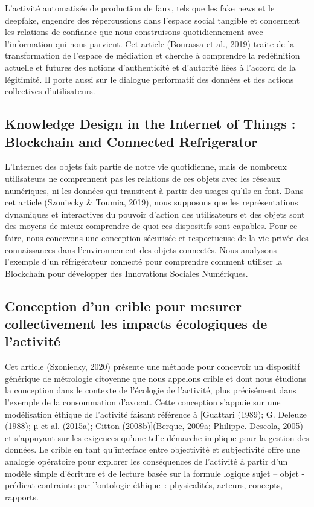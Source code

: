 \documentclass[
  a4paper,
  DIV=11,
  numbers=noendperiod]{scrreprt}
\begin{document}
L'activité automatisée de production de faux, tels que les
\hspace{0pt}fake news\hspace{0pt} et le
\hspace{0pt}deepfake\hspace{0pt}, engendre des répercussions dans
l'espace social tangible et concernent les relations de confiance que
nous construisons quotidiennement avec l'information qui nous parvient.
Cet article (Bourassa et al., 2019) traite de la transformation de
l'espace de médiation et cherche à comprendre la redéfinition actuelle
et futures des notions d'authenticité et d'autorité liées à l'accord de
la légitimité. Il porte aussi sur le dialogue performatif des données et
des actions collectives d'utilisateurs.

\subsection{Knowledge Design in the Internet of Things : Blockchain and
Connected
Refrigerator}\label{knowledge-design-in-the-internet-of-things-blockchain-and-connected-refrigerator}

L'Internet des objets fait partie de notre vie quotidienne, mais de
nombreux utilisateurs ne comprennent pas les relations de ces objets
avec les réseaux numériques, ni les données qui transitent à partir des
usages qu'ils en font. Dans cet article (Szoniecky \& Toumia, 2019),
nous supposons que les représentations dynamiques et interactives du
pouvoir d'action des utilisateurs et des objets sont des moyens de mieux
comprendre de quoi ces dispositifs sont capables. Pour ce faire, nous
concevons une conception sécurisée et respectueuse de la vie privée des
connaissances dans l'environnement des objets connectés. Nous analysons
l'exemple d'un réfrigérateur connecté pour comprendre comment utiliser
la Blockchain pour développer des Innovations Sociales Numériques.

\subsection{Conception d'un crible pour mesurer collectivement les
impacts écologiques de
l'activité}\label{conception-dun-crible-pour-mesurer-collectivement-les-impacts-uxe9cologiques-de-lactivituxe9}

Cet article (Szoniecky, 2020) présente une méthode pour concevoir un
dispositif générique de métrologie citoyenne que nous appelons crible et
dont nous étudions la conception dans le contexte de l'écologie de
l'activité, plus précisément dans l'exemple de la consommation d'avocat.
Cette conception s'appuie sur une modélisation éthique de l'activité
faisant référence à {[}Guattari (1989); G. Deleuze (1988); µ et al.
(2015a); Citton (2008b){]}(Berque, 2009a; Philippe. Descola, 2005) et
s'appuyant sur les exigences qu'une telle démarche implique pour la
gestion des données. Le crible en tant qu'interface entre objectivité et
subjectivité offre une analogie opératoire pour explorer les
conséquences de l'activité à partir d'un modèle simple d'écriture et de
lecture basée sur la formule logique sujet -- objet - prédicat
contrainte par l'ontologie éthique~: physicalités, acteurs, concepts,
rapports.
\end{document}

